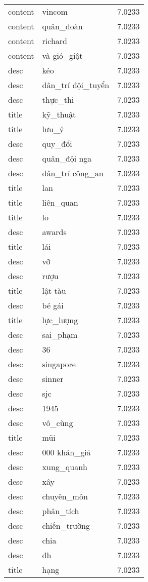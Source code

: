 \documentclass{article}
\begin{document}
\begin{tabular}{lll}
content & vincom & 7.0233\\
content & quân\_đoàn & 7.0233\\
content & richard & 7.0233\\
content & và gió\_giật & 7.0233\\
desc & kéo & 7.0233\\
desc & dân\_trí đội\_tuyển & 7.0233\\
desc & thực\_thi & 7.0233\\
title & kỹ\_thuật & 7.0233\\
title & lưu\_ý & 7.0233\\
desc & quy\_đổi & 7.0233\\
desc & quân\_đội nga & 7.0233\\
desc & dân\_trí công\_an & 7.0233\\
title & lan & 7.0233\\
title & liên\_quan & 7.0233\\
title & lo & 7.0233\\
desc & awards & 7.0233\\
title & lái & 7.0233\\
desc & vỡ & 7.0233\\
desc & rượu & 7.0233\\
title & lật tàu & 7.0233\\
desc & bé gái & 7.0233\\
title & lực\_lượng & 7.0233\\
desc & sai\_phạm & 7.0233\\
desc & 36 & 7.0233\\
desc & singapore & 7.0233\\
desc & sinner & 7.0233\\
desc & sjc & 7.0233\\
desc & 1945 & 7.0233\\
desc & vô\_cùng & 7.0233\\
title & mũi & 7.0233\\
desc & 000 khán\_giả & 7.0233\\
desc & xung\_quanh & 7.0233\\
desc & xây & 7.0233\\
desc & chuyên\_môn & 7.0233\\
desc & phân\_tích & 7.0233\\
desc & chiến\_trường & 7.0233\\
desc & chia & 7.0233\\
desc & đh & 7.0233\\
title & hạng & 7.0233\\

\end{tabular}
\end{document}
